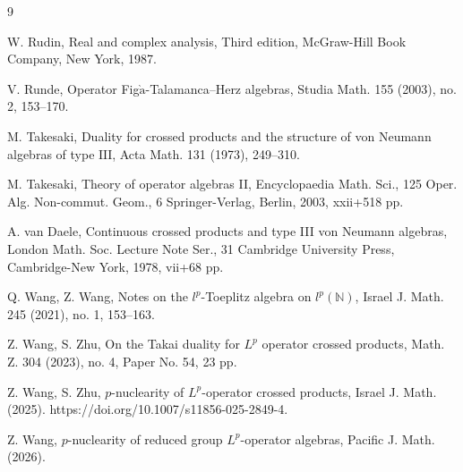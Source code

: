 \documentclass[reqno,11pt]{amsart}
\theoremstyle{plain}
\theoremstyle{definition}
\theoremstyle{remark}
\begin{document}
\begin{thebibliography}{9}
%


W. Rudin, Real and complex analysis, Third edition, McGraw-Hill Book Company, New York, 1987.

V. Runde, Operator Fig$\grave{\mathrm{a}}$-Talamanca–Herz algebras, Studia Math. 155 (2003), no. 2, 153--170.


M. Takesaki, Duality for crossed products and the structure of von Neumann algebras of type $\mathrm{III}$, Acta Math. 131 (1973), 249--310.

 M. Takesaki, Theory of operator algebras II, Encyclopaedia Math. Sci., 125
Oper. Alg. Non-commut. Geom., 6 Springer-Verlag, Berlin, 2003, xxii+518 pp.

A. van Daele, Continuous crossed products and type  III  von Neumann algebras, London Math. Soc. Lecture Note Ser., 31
Cambridge University Press, Cambridge-New York, 1978, vii+68 pp.




       Q. Wang, Z. Wang, Notes on the $l^p$-Toeplitz algebra on $l^p(\mathbb{N})$, Israel J. Math. 245 (2021), no. 1, 153--163.

        Z. Wang, S. Zhu, On the Takai duality for $L^{p}$ operator crossed products, Math. Z. 304 (2023), no. 4, Paper No. 54, 23 pp.

          Z. Wang, S. Zhu, $p$-nuclearity of $L^p$-operator crossed products, Israel J. Math. (2025). https://doi.org/10.1007/s11856-025-2849-4.

Z. Wang, $p$-nuclearity of reduced group $L^p$-operator algebras, Pacific J.  Math. (2026).
\end{thebibliography}
\end{document}
